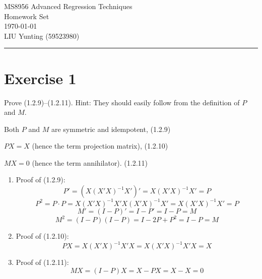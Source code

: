 \documentclass[12pt, letterpaper, onecolumn]{exam}
\begin{document}
\begingroup
\centering
\LARGE MS8956 Advanced Regression Techniques\\
\LARGE Homework Set\\[1em]
\large \today\\[0.5em]
\large LIU Yunting (59523980)\par \endgroup \rule{\textwidth}{0.4pt} \pointsdroppedatright
\printanswers
\renewcommand{\solutiontitle}{\noindent
    \textbf{Answer:}\enspace}

\section*{Exercise 1}
Prove (1.2.9)--(1.2.11). Hint: They should easily follow from the definition
of $P$ and $M$.

Both $P$ and $M$ are symmetric and idempotent, (1.2.9)

$PX = X$ (hence the term projection matrix), (1.2.10)

$MX = 0$ (hence the term annihilator). (1.2.11)
\begin{solution}
    \begin{enumerate}
        \item Proof of (1.2.9):
              \[
                  P' = (X(X'X)^{-1}X')' = X(X'X)^{-1}X' = P
              \]
              \[
                  P^{2}= P \cdot P = X(X'X)^{-1}X'X(X'X)^{-1}X' = X(X'X)^{-1}X'
                  = P
              \]
              \[
                  M' = (I - P)' = I - P' = I - P = M
              \]
              \[
                  M^{2}= (I - P)(I - P) = I - 2P + P^{2}= I - P = M
              \]

        \item Proof of (1.2.10):
              \[
                  PX = X(X'X)^{-1}X'X = X(X'X)^{-1}X'X = X
              \]

        \item Proof of (1.2.11):
              \[
                  MX = (I - P)X = X - PX = X - X = 0
              \]
    \end{enumerate}
\end{solution}
\end{document}
